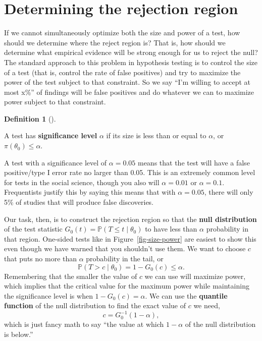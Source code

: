 \documentclass[
  letterpaper,
  DIV=11,
  numbers=noendperiod]{scrreprt}
\renewcommand{\P}{\mathbb{P}}
\theoremstyle{definition}
\newtheorem{definition}{Definition}[chapter]
\theoremstyle{plain}
\theoremstyle{definition}
\theoremstyle{remark}
\begin{document}
\hypertarget{determining-the-rejection-region}{%
\section{Determining the rejection
region}\label{determining-the-rejection-region}}

If we cannot simultaneously optimize both the size and power of a test,
how should we determine where the reject region is? That is, how should
we determine what empirical evidence will be strong enough for us to
reject the null? The standard approach to this problem in hypothesis
testing is to control the size of a test (that is, control the rate of
false positives) and try to maximize the power of the test subject to
that constraint. So we say ``I'm willing to accept at most x\%'' of
findings will be false positives and do whatever we can to maximize
power subject to that constraint.

\leavevmode{}%
\begin{definition}[]\label{def-level}

A test has \textbf{significance level} \(\alpha\) if its size is less
than or equal to \(\alpha\), or \(\pi(\theta_0) \leq \alpha\).

\end{definition}

A test with a significance level of \(\alpha = 0.05\) means that the
test will have a false positive/type I error rate no larger than 0.05.
This is an extremely common level for tests in the social science,
though you also will \(\alpha = 0.01\) or \(\alpha = 0.1\). Frequentists
justify this by saying this means that with \(\alpha = 0.05\), there
will only 5\% of studies that will produce false discoveries.

Our task, then, is to construct the rejection region so that the
\textbf{null distribution} of the test statistic
\(G_0(t) = \P(T \leq t \mid \theta_0)\) to have less than \(\alpha\)
probability in that region. One-sided tests like in
Figure~\ref{fig-size-power} are easiest to show this even though we have
warned that you shouldn't use them. We want to choose \(c\) that puts no
more than \(\alpha\) probability in the tail, or \[ 
\P(T > c \mid \theta_0) = 1 - G_0(c) \leq \alpha.
\] Remembering that the smaller the value of \(c\) we can use will
maximize power, which implies that the critical value for the maximum
power while maintaining the significance level is when
\(1 - G_0(c) = \alpha\). We can use the \textbf{quantile function} of
the null distribution to find the exact value of \(c\) we need, \[
c = G^{-1}_0(1 - \alpha),
\] which is just fancy math to say ``the value at which \(1-\alpha\) of
the null distribution is below.''
\end{document}

